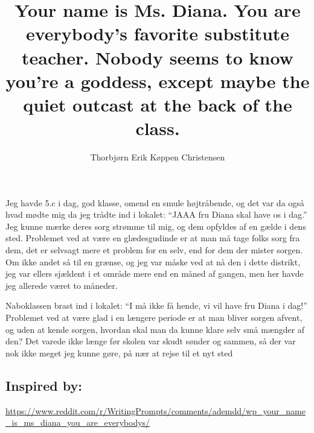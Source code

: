 \documentclass[oneside,danish,onecolumn,openbib,a4paper]{memoir}
\title{Your name is Ms. Diana. You are everybody's favorite substitute teacher. Nobody seems to know you're a goddess, except maybe the quiet outcast at the back of the class.}
\author{Thorbjørn Erik Køppen Christensen}
\begin{document}
\maketitle{}

Jeg havde 5.c i dag, god klasse, omend en smule højtråbende, og det var da også hvad mødte mig da jeg trådte ind i lokalet: ``JAAA fru Diana skal have os i dag.'' 
Jeg kunne mærke deres sorg strømme til mig, og dem opfyldes af en gælde i dens sted. 
Problemet ved at være en glædesgudinde er at man må tage folks sorg fra dem, det er selvsagt mere et problem for en selv, end for dem der mister sorgen. 
Om ikke andet så til en grænse, og jeg var måske ved at nå den i dette distrikt, jeg var ellers sjældent i et område mere end en måned af gangen, men her havde jeg allerede været to måneder.

Naboklassen brast ind i lokalet: ``I må ikke få hende, vi vil have fru Diana i dag!''
Problemet ved at være glad i en længere periode er at man bliver sorgen afvent, og uden at kende sorgen, hvordan skal man da kunne klare selv små mængder af den?
Det varede ikke længe før skolen var skudt sønder og sammen, så der var nok ikke meget jeg kunne gøre, på nær at rejse til et nyt sted
\newline\newline\newline
\subsection{Inspired by:}
\url{https://www.reddit.com/r/WritingPrompts/comments/ademdd/wp_your_name_is_ms_diana_you_are_everybodys/}
\end{document}
